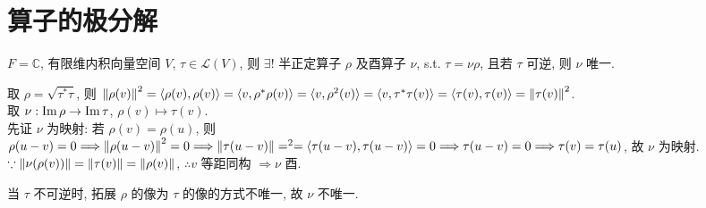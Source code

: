 \documentclass{note}
\begin{document}
\section{算子的极分解}
\begin{thm}
    $F=\mathbb{C}$, 有限维内积向量空间 $V$, $\tau\in\mathcal{L}(V)$, 则 $\exists!$ 半正定算子 $\rho$ 及酉算子 $\nu$, s.t. $\tau=\nu\rho$, 且若 $\tau$ 可逆, 则 $\nu$ 唯一.
\end{thm}
\begin{pf}
    \begin{itemize}
        取 $\rho=\sqrt{\tau^*\tau}$, 则 $\left\lVert\rho(v)\right\rVert^2=\langle\rho(v),\rho(v)\rangle=\langle v,\rho^*\rho(v)\rangle=\langle v,\rho^2(v)\rangle=\langle v,\tau^*\tau(v)\rangle=\langle\tau(v),\tau(v)\rangle=\left\lVert\tau(v)\right\rVert^2$.\\
        取 $\nu:\operatorname{Im}\rho\rightarrow\operatorname{Im}\tau$, $\rho(v)\mapsto\tau(v)$.\\
        先证 $\nu$ 为映射: 若 $\rho(v)=\rho(u)$, 则 $\rho(u-v)=0\Longrightarrow\left\lVert\rho(u-v)\right\rVert^2=0\Longrightarrow\left\lVert\tau(u-v)\right\rVert=^2=\langle\tau(u-v),\tau(u-v)\rangle=0\Longrightarrow\tau(u-v)=0\Longrightarrow\tau(v)=\tau(u)$, 故 $\nu$ 为映射.\\
        $\because\left\lVert\nu(\rho(v))\right\rVert=\left\lVert\tau(v)\right\rVert=\left\lVert\rho(v)\right\rVert$, $\therefore v$ 等距同构 $\Longrightarrow\nu$ 酉.

        当 $\tau$ 不可逆时, 拓展 $\rho$ 的像为 $\tau$ 的像的方式不唯一, 故 $\nu$ 不唯一.
    \end{itemize}
\end{pf}
\ifx\allfiles\undefined
\end{document}
